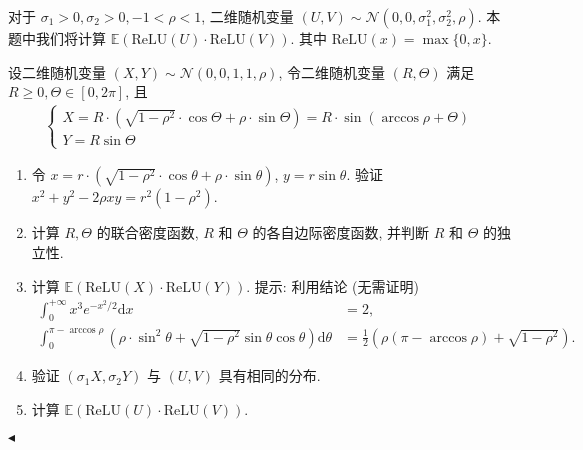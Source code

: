 \documentclass[11pt]{article}
\newenvironment{problem}[2][Problem]{\begin{trivlist}
    \item[\hskip \labelsep {\bfseries #1}\hskip \labelsep {\bfseries #2.}]\songti}{\hfill$\blacktriangleleft$\end{trivlist}}
\newcommand\1{\mathds{1}}
\newcommand\E{\mathbb{E}}
\newcommand\dd{\mathrm{d}}
\newcommand\ReLU{\mathrm{ReLU}}
\begin{document}
\begin{problem}{2}
    对于 $\sigma_1 >0, \sigma_2 > 0, -1 < \rho < 1$, 二维随机变量 $(U,V) \sim \mathcal{N}(0,0, \sigma_1^2, \sigma_2^2, \rho)$. 
    本题中我们将计算 $\E(\ReLU(U) \cdot \ReLU(V))$. 其中 $\ReLU(x) = \max\{0,x\}$.

    设二维随机变量 $(X,Y)\sim \mathcal{N}(0,0,1,1,\rho)$, 令二维随机变量 $(R,\Theta)$ 满足 $R\ge 0, \Theta\in [0,2\pi]$, 且
    \begin{equation}
        \begin{aligned}
            \begin{cases}
                X = R\cdot \left(\sqrt{1-\rho^2} \cdot \cos\Theta + \rho \cdot \sin \Theta\right) = R \cdot \sin(\arccos \rho + \Theta)\\
                Y = R\sin\Theta
            \end{cases}
        \end{aligned}
        \label{eq:2}
    \end{equation}
    \begin{enumerate}[label=(\arabic*)]
        \item 令 $x = r\cdot\left(\sqrt{1-\rho^2} \cdot \cos\theta + \rho \cdot \sin \theta\right)$, $y = r\sin\theta$. 验证 $x^2 + y^2 - 2\rho xy = r^2 (1- \rho^2)$.
        \item 计算 $R, \Theta$ 的联合密度函数, $R$ 和 $\Theta$ 的各自边际密度函数, 并判断 $R$ 和 $\Theta$ 的独立性.
        \item 计算 $\E(\ReLU(X) \cdot \ReLU(Y))$. {\kaishu 提示: 利用结论 (无需证明)} 
        \begin{align*}
            \int_{0}^{+\infty} x^3 e^{-x^2/2} \dd x &= 2, \\
            \int_{0}^{\pi - \arccos \rho} \left(\rho \cdot \sin^2 \theta + \sqrt{1-\rho^2}\sin\theta\cos\theta\right)\dd \theta &= \frac{1}{2} \left(\rho(\pi - \arccos\rho) + \sqrt{1-\rho^2}\right).
        \end{align*}
        \item 验证 $(\sigma_1X, \sigma_2Y)$ 与 $(U,V)$ 具有相同的分布.
        \item 计算 $\E(\ReLU(U) \cdot \ReLU(V))$.
    \end{enumerate}
\end{problem}
\end{document}
